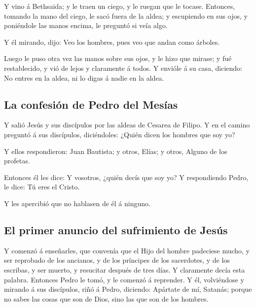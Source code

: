  Y vino á Bethsaida; y le traen un ciego, y le ruegan que
le tocase.  Entonces, tomando la mano del ciego, le sacó
fuera de la aldea; y escupiendo en sus ojos, y poniéndole las manos
encima, le preguntó si veía algo.

 Y él mirando, dijo: Veo los hombres, pues veo que andan
como árboles.

 Luego le puso otra vez las manos sobre sus ojos, y le
hizo que mirase; y fué restablecido, y vió de lejos y claramente á
todos.  Y envióle á su casa, diciendo: No entres en la
aldea, ni lo digas á nadie en la aldea.

\hypertarget{la-confesiuxf3n-de-pedro-del-mesuxedas}{%
\subsection{La confesión de Pedro del
Mesías}\label{la-confesiuxf3n-de-pedro-del-mesuxedas}}

 Y salió Jesús y sus discípulos por las aldeas de Cesarea
de Filipo. Y en el camino preguntó á sus discípulos, diciéndoles: ¿Quién
dicen los hombres que soy yo?

 Y ellos respondieron: Juan Bautista; y otros, Elías; y
otros, Alguno de los profetas.

 Entonces él les dice: Y vosotros, ¿quién decís que soy
yo? Y respondiendo Pedro, le dice: Tú eres el Cristo.

 Y les apercibió que no hablasen de él á ninguno.

\hypertarget{el-primer-anuncio-del-sufrimiento-de-jesuxfas}{%
\subsection{El primer anuncio del sufrimiento de
Jesús}\label{el-primer-anuncio-del-sufrimiento-de-jesuxfas}}

 Y comenzó á enseñarles, que convenía que el Hijo del
hombre padeciese mucho, y ser reprobado de los ancianos, y de los
príncipes de los sacerdotes, y de los escribas, y ser muerto, y
resucitar después de tres días.  Y claramente decía esta
palabra. Entonces Pedro le tomó, y le comenzó á reprender.
 Y él, volviéndose y mirando á sus discípulos, riñó á
Pedro, diciendo: Apártate de mí, Satanás; porque no sabes las cosas que
son de Dios, sino las que son de los hombres.

